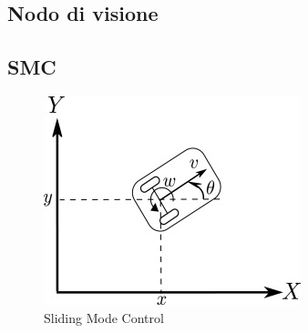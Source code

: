 \subsection{Nodo di visione}
\subsection{SMC}
\begin{figure} [H]
    \centering
    \includegraphics[width=0.5\linewidth]{img/SMC.jpg}
    \caption{Sliding Mode Control}
    \label{fig:SMC}
\end{figure}
